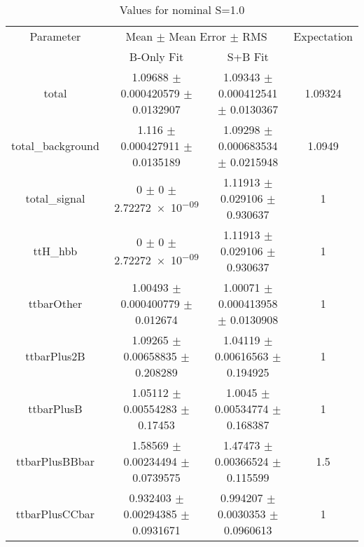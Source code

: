 \begin{table}
\centering
\caption{Values for nominal S=1.0}
\begin{tabular}{cccc}
\toprule
Parameter & \multicolumn{2}{c}{Mean $\pm$ Mean Error $\pm$ RMS} & Expectation\\
 & B-Only Fit & S+B Fit & \\
\midrule
total & \num{1.09688} $\pm$ \num{0.000420579} $\pm$ \num{0.0132907} & \num{1.09343} $\pm$ \num{0.000412541} $\pm$ \num{0.0130367} & \num{1.09324}\\
total\_background & \num{1.116} $\pm$ \num{0.000427911} $\pm$ \num{0.0135189} & \num{1.09298} $\pm$ \num{0.000683534} $\pm$ \num{0.0215948} & \num{1.0949}\\
total\_signal & \num{0} $\pm$ \num{0} $\pm$ \num{2.72272e-09} & \num{1.11913} $\pm$ \num{0.029106} $\pm$ \num{0.930637} & \num{1}\\
ttH\_hbb & \num{0} $\pm$ \num{0} $\pm$ \num{2.72272e-09} & \num{1.11913} $\pm$ \num{0.029106} $\pm$ \num{0.930637} & \num{1}\\
ttbarOther & \num{1.00493} $\pm$ \num{0.000400779} $\pm$ \num{0.012674} & \num{1.00071} $\pm$ \num{0.000413958} $\pm$ \num{0.0130908} & \num{1}\\
ttbarPlus2B & \num{1.09265} $\pm$ \num{0.00658835} $\pm$ \num{0.208289} & \num{1.04119} $\pm$ \num{0.00616563} $\pm$ \num{0.194925} & \num{1}\\
ttbarPlusB & \num{1.05112} $\pm$ \num{0.00554283} $\pm$ \num{0.17453} & \num{1.0045} $\pm$ \num{0.00534774} $\pm$ \num{0.168387} & \num{1}\\
ttbarPlusBBbar & \num{1.58569} $\pm$ \num{0.00234494} $\pm$ \num{0.0739575} & \num{1.47473} $\pm$ \num{0.00366524} $\pm$ \num{0.115599} & \num{1.5}\\
ttbarPlusCCbar & \num{0.932403} $\pm$ \num{0.00294385} $\pm$ \num{0.0931671} & \num{0.994207} $\pm$ \num{0.0030353} $\pm$ \num{0.0960613} & \num{1}\\
\bottomrule
\end{tabular}
\end{table}